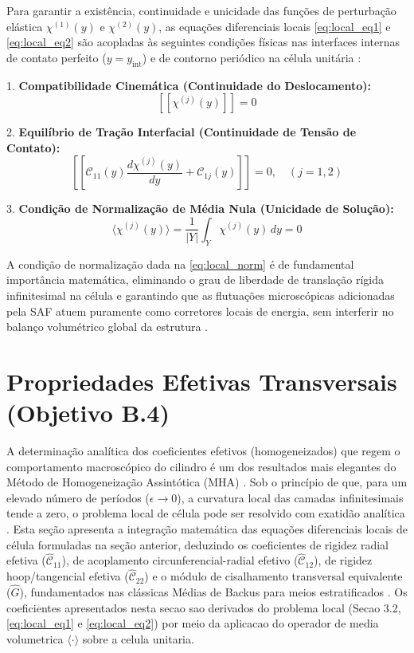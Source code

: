Para garantir a existência, continuidade e unicidade das funções de perturbação elástica $\chi^{(1)}(y)$ e $\chi^{(2)}(y)$, as equações diferenciais locais \eqref{eq:local_eq1} e \eqref{eq:local_eq2} são acopladas às seguintes condições físicas nas interfaces internas de contato perfeito ($y = y_{\text{int}}$) e de contorno periódico na célula unitária \cite{bakhvalov1989}:

1. \textbf{Compatibilidade Cinemática (Continuidade do Deslocamento):}
\begin{equation}
  \left[\left[ \chi^{(j)}(y) \right]\right] = 0
  \label{eq:local_cont_disp}
\end{equation}

2. \textbf{Equilíbrio de Tração Interfacial (Continuidade de Tensão de Contato):}
\begin{equation}
  \left[\left[ \mathcal{C}_{11}(y) \frac{d \chi^{(j)}(y)}{d y} + \mathcal{C}_{1j}(y) \right]\right] = 0, \quad (j = 1, 2)
  \label{eq:local_cont_stress}
\end{equation}

3. \textbf{Condição de Normalização de Média Nula (Unicidade de Solução):}
\begin{equation}
  \langle \chi^{(j)}(y) \rangle = \frac{1}{|Y|} \int_Y \chi^{(j)}(y) \, d y = 0
  \label{eq:local_norm}
\end{equation}

A condição de normalização dada na \eqref{eq:local_norm} é de fundamental importância matemática, eliminando o grau de liberdade de translação rígida infinitesimal na célula e garantindo que as flutuações microscópicas adicionadas pela SAF atuem puramente como corretores locais de energia, sem interferir no balanço volumétrico global da estrutura \cite{bakhvalov1989}.

\section{Propriedades Efetivas Transversais (Objetivo B.4)}

A determinação analítica dos coeficientes efetivos (homogeneizados) que regem o comportamento macroscópico do cilindro é um dos resultados mais elegantes do Método de Homogeneização Assintótica (MHA) \cite{bakhvalov1989}. Sob o princípio de que, para um elevado número de períodos ($\epsilon \to 0$), a curvatura local das camadas infinitesimais tende a zero, o problema local de célula pode ser resolvido com exatidão analítica \cite{Backus1962}. Esta seção apresenta a integração matemática das equações diferenciais locais de célula formuladas na seção anterior, deduzindo os coeficientes de rigidez radial efetiva ($\hat{\mathcal{C}}_{11}$), de acoplamento circunferencial-radial efetivo ($\hat{\mathcal{C}}_{12}$), de rigidez hoop/tangencial efetiva ($\hat{\mathcal{C}}_{22}$) e o módulo de cisalhamento transversal equivalente ($\hat{G}$), fundamentados nas clássicas Médias de Backus para meios estratificados \cite{Backus1962}. Os coeficientes apresentados nesta secao sao derivados do problema local (Secao 3.2, \eqref{eq:local_eq1} e \eqref{eq:local_eq2}) por meio da aplicacao do operador de media volumetrica $\langle \cdot \rangle$ sobre a celula unitaria.

